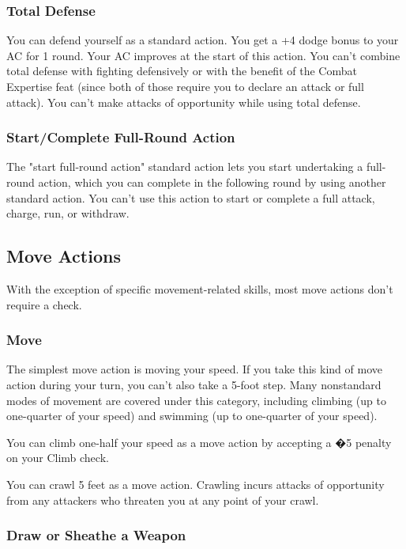 \subsubsection{Total Defense}

You can defend yourself as a standard action. You get a +4 dodge bonus to your AC for 1 round. Your AC improves at the start of this action. You can't combine total defense with fighting defensively or with the benefit of the Combat Expertise feat (since both of those require you to declare an attack or full attack). You can't make attacks of opportunity while using total defense.

\subsubsection{Start/Complete Full-Round Action}

The "start full-round action" standard action lets you start undertaking a full-round action, which you can complete in the following round by using another standard action. You can't use this action to start or complete a full attack, charge, run, or withdraw.

\subsection{Move Actions}

With the exception of specific movement-related skills, most move actions don't require a check.

\subsubsection{Move}

The simplest move action is moving your speed. If you take this kind of move action during your turn, you can't also take a 5-foot step.
Many nonstandard modes of movement are covered under this category, including climbing (up to one-quarter of your speed) and swimming (up to one-quarter of your speed).

You can climb one-half your speed as a move action by accepting a �5 penalty on your Climb check.

You can crawl 5 feet as a move action. Crawling incurs attacks of opportunity from any attackers who threaten you at any point of your crawl.

\subsubsection{Draw or Sheathe a Weapon}


